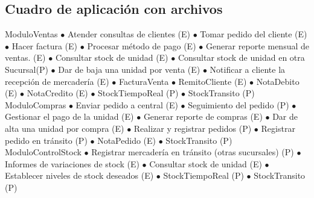 \subsection{Cuadro de aplicación con archivos}

\begin{cuadroAplicacionArchivos}
  \cuadroAplicacionArchivosItem
    {ModuloVentas}
    {
      $\bullet$ Atender consultas de clientes (E) \newline
      $\bullet$ Tomar pedido del cliente (E)\newline
      $\bullet$ Hacer factura (E)\newline
      $\bullet$ Procesar método de pago (E)\newline
      $\bullet$ Generar reporte mensual de ventas. (E)\newline
      $\bullet$ Consultar stock de unidad (E)\newline
      $\bullet$ Consultar stock de unidad en otra Sucursal(P)\newline
      $\bullet$ Dar de baja una unidad por venta (E)\newline
      $\bullet$ Notificar a cliente la recepción de mercadería (E)
    }
    {
      $\bullet$ FacturaVenta\newline
      $\bullet$ RemitoCliente (E)\newline
      $\bullet$ NotaDebito (E)\newline
      $\bullet$ NotaCredito (E)\newline
      $\bullet$ StockTiempoReal (P)\newline
      $\bullet$ StockTransito (P)
    }
  \cuadroAplicacionArchivosItem
    {ModuloCompras}
    {
      $\bullet$ Enviar pedido a central (E)\newline
      $\bullet$ Seguimiento del pedido (P)\newline
      $\bullet$ Gestionar el pago de la unidad (E)\newline
      $\bullet$ Generar reporte de compras (E)\newline
      $\bullet$ Dar de alta una unidad por compra (E)\newline
      $\bullet$ Realizar y registrar pedidos (P)\newline
      $\bullet$ Registrar pedido en tránsito (P)
    }
    {
      $\bullet$ NotaPedido (E)\newline
      $\bullet$ StockTransito (P)
    }
  \cuadroAplicacionArchivosItem
    {ModuloControlStock}
    {
      $\bullet$ Registrar mercadería en tránsito (otras sucursales) (P)\newline
      $\bullet$ Informes de variaciones de stock (E)\newline
      $\bullet$ Consultar stock de unidad (E)\newline
      $\bullet$ Establecer niveles de stock deseados (E)
    }
    {
      $\bullet$ StockTiempoReal (P)\newline
      $\bullet$ StockTransito (P)
    }
\end{cuadroAplicacionArchivos}

